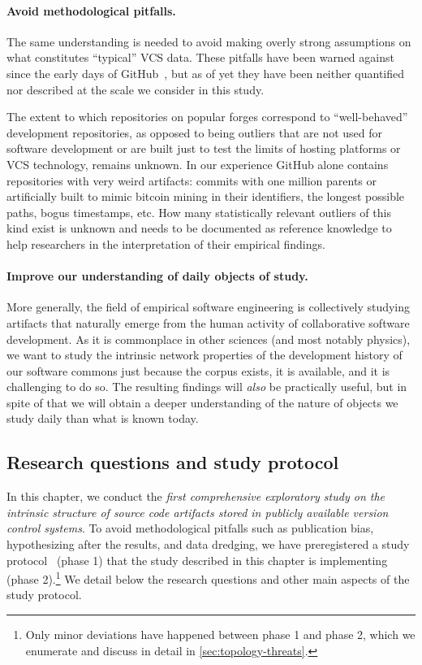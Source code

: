 \paragraph{Avoid methodological pitfalls.}

The same understanding is needed to avoid making overly strong assumptions on
what constitutes ``typical'' VCS data. These pitfalls have been warned against
since the early days of GitHub~\cite{kalliamvakou2014promises}, but as of yet
they have been neither quantified nor described at the scale we consider in
this study.

The extent to which repositories on popular forges correspond to
``well-behaved'' development repositories, as opposed to being outliers that
are not used for software development or are built just to test the limits of
hosting platforms or \gls{VCS} technology, remains unknown. In our experience
GitHub alone contains repositories with very weird artifacts: commits with one
million parents or artificially built to mimic bitcoin mining in their
identifiers, the longest possible paths, bogus timestamps, etc.  How many
statistically relevant outliers of this kind exist is unknown and needs to be
documented as reference knowledge to help researchers in the interpretation of
their empirical findings.


\paragraph{Improve our understanding of daily objects of study.}

More generally, the field of empirical software engineering is collectively
studying artifacts that naturally emerge from the human activity of
collaborative software development. As it is commonplace in other sciences (and
most notably physics), we want to study the intrinsic network properties of the
development history of our software commons just because the corpus exists, it
is available, and it is challenging to do so. The resulting findings will
\emph{also} be practically useful, but in spite of that we will obtain a deeper
understanding of the nature of objects we study daily than what is known today.


\subsection{Research questions and study protocol}

In this chapter, we conduct the \emph{first comprehensive exploratory study on
  the intrinsic structure of source code artifacts stored in publicly available
  version control systems}. To avoid methodological pitfalls such as
publication bias, hypothesizing after the results, and data dredging, we have
preregistered a study protocol~\cite{msr-2020-topology} (phase 1) that the
study described in this chapter is implementing (phase 2).\footnote{Only minor
deviations have happened between phase 1 and phase 2, which we enumerate and
discuss in detail in \cref{sec:topology-threats}.} We detail below the
research questions and other main aspects of the study protocol.

